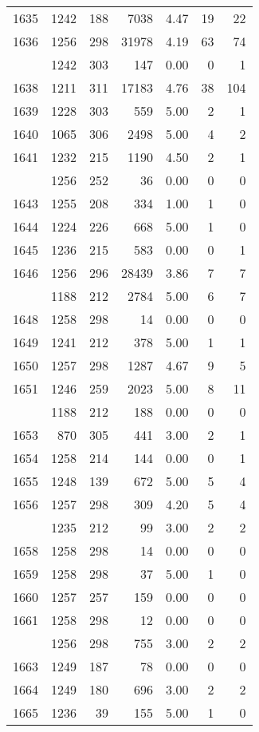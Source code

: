 \documentclass[
]{article}
\begin{document}
\begin{table}
\begin{tabular}[t]{lrrrrrr}
1635 & 1242 & 188 & 7038 & 4.47 & 19 & 22\\
1636 & 1256 & 298 & 31978 & 4.19 & 63 & 74\\
\addlinespace
1637 & 1242 & 303 & 147 & 0.00 & 0 & 1\\
1638 & 1211 & 311 & 17183 & 4.76 & 38 & 104\\
1639 & 1228 & 303 & 559 & 5.00 & 2 & 1\\
1640 & 1065 & 306 & 2498 & 5.00 & 4 & 2\\
1641 & 1232 & 215 & 1190 & 4.50 & 2 & 1\\
\addlinespace
1642 & 1256 & 252 & 36 & 0.00 & 0 & 0\\
1643 & 1255 & 208 & 334 & 1.00 & 1 & 0\\
1644 & 1224 & 226 & 668 & 5.00 & 1 & 0\\
1645 & 1236 & 215 & 583 & 0.00 & 0 & 1\\
1646 & 1256 & 296 & 28439 & 3.86 & 7 & 7\\
\addlinespace
1647 & 1188 & 212 & 2784 & 5.00 & 6 & 7\\
1648 & 1258 & 298 & 14 & 0.00 & 0 & 0\\
1649 & 1241 & 212 & 378 & 5.00 & 1 & 1\\
1650 & 1257 & 298 & 1287 & 4.67 & 9 & 5\\
1651 & 1246 & 259 & 2023 & 5.00 & 8 & 11\\
\addlinespace
1652 & 1188 & 212 & 188 & 0.00 & 0 & 0\\
1653 & 870 & 305 & 441 & 3.00 & 2 & 1\\
1654 & 1258 & 214 & 144 & 0.00 & 0 & 1\\
1655 & 1248 & 139 & 672 & 5.00 & 5 & 4\\
1656 & 1257 & 298 & 309 & 4.20 & 5 & 4\\
\addlinespace
1657 & 1235 & 212 & 99 & 3.00 & 2 & 2\\
1658 & 1258 & 298 & 14 & 0.00 & 0 & 0\\
1659 & 1258 & 298 & 37 & 5.00 & 1 & 0\\
1660 & 1257 & 257 & 159 & 0.00 & 0 & 0\\
1661 & 1258 & 298 & 12 & 0.00 & 0 & 0\\
\addlinespace
1662 & 1256 & 298 & 755 & 3.00 & 2 & 2\\
1663 & 1249 & 187 & 78 & 0.00 & 0 & 0\\
1664 & 1249 & 180 & 696 & 3.00 & 2 & 2\\
1665 & 1236 & 39 & 155 & 5.00 & 1 & 0\\

\end{tabular}
\end{table}
\end{document}
